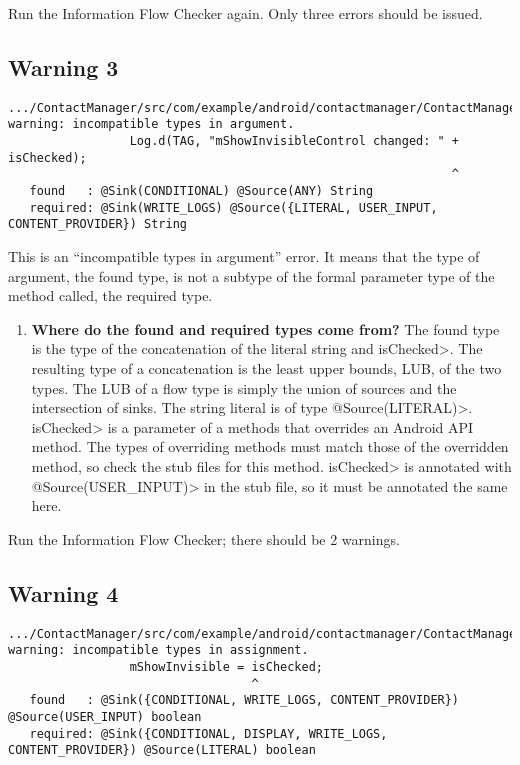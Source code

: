    Run the Information Flow Checker again.  Only three errors should be issued.


  \subsection{Warning 3 }
   \begin{Verbatim}
.../ContactManager/src/com/example/android/contactmanager/ContactManager.java:74: 
warning: incompatible types in argument.
                 Log.d(TAG, "mShowInvisibleControl changed: " + isChecked);
                                                              ^
   found   : @Sink(CONDITIONAL) @Source(ANY) String
   required: @Sink(WRITE_LOGS) @Source({LITERAL, USER_INPUT, CONTENT_PROVIDER}) String
\end{Verbatim} 
This is an ``incompatible types in argument'' error.  It means that the type
of argument, the found type, is not a subtype of the formal 
parameter type of the method called, the required type.
 \begin{enumerate}

\item\textbf{Where do the found and required types come from?}
The found type is the type of the concatenation of the literal string and \<isChecked>.  The
resulting type of a concatenation is the least upper bounds, LUB, of the two types.   The LUB
of a flow type is simply 
 the union of sources and the intersection of sinks.  The string literal is of type 
\<@Source(LITERAL)>.  \<isChecked> is a parameter of a methods that overrides an
Android API method.  The types of overriding methods must match those of the overridden
method, so check the stub files for this method.  \<isChecked> is annotated with 
\<@Source(USER\_INPUT)>  in the stub file, so it must be annotated the same here.\newline

 \end{enumerate}

Run the Information Flow Checker; there should be 2 warnings.
  
  \subsection{Warning 4 }
   \begin{Verbatim}
.../ContactManager/src/com/example/android/contactmanager/ContactManager.java:77: 
warning: incompatible types in assignment.
                 mShowInvisible = isChecked;
                                  ^
   found   : @Sink({CONDITIONAL, WRITE_LOGS, CONTENT_PROVIDER}) @Source(USER_INPUT) boolean
   required: @Sink({CONDITIONAL, DISPLAY, WRITE_LOGS, CONTENT_PROVIDER}) @Source(LITERAL) boolean
    \end{Verbatim} 

